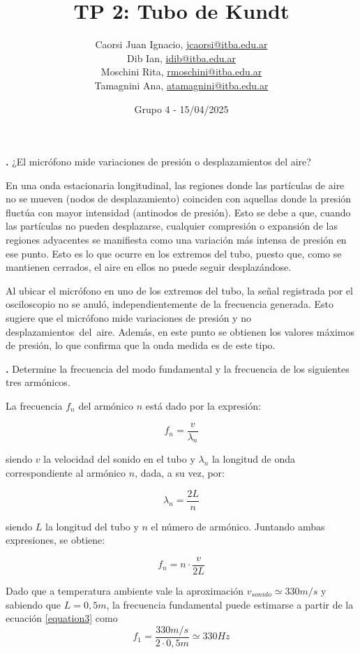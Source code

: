 \documentclass[12pt, a4paper]{article}
\title{TP 2: Tubo de Kundt}
\author
{
  Caorsi Juan Ignacio, \href{jcaorsi@itba.edu.ar}{jcaorsi@itba.edu.ar} \\
  Dib Ian, \href{idib@itba.edu.ar}{idib@itba.edu.ar} \\
  Moschini Rita, \href{rmoschini@itba.edu.ar}{rmoschini@itba.edu.ar} \\
  Tamagnini Ana, \href{atamagnini@itba.edu.ar}{atamagnini@itba.edu.ar}
}
\date{Grupo 4 - 15/04/2025}
\newcounter{step}
\newcommand{\step}[1]
{
  \par\vspace{2ex}
  \stepcounter{step}
  \noindent\textbf{\arabic{step}.} #1\par\vspace{1ex}
}
\begin{document}
\maketitle


\step{¿El micrófono mide variaciones de presión o desplazamientos del aire?}

En una onda estacionaria longitudinal, las regiones donde las partículas de aire  no se mueven (nodos de desplazamiento) coinciden con aquellas donde la presión fluctúa con mayor intensidad (antinodos de presión). Esto se debe a que, cuando las partículas no pueden desplazarse, cualquier compresión o expansión de las regiones adyacentes se manifiesta como una variación más intensa de presión en ese punto. Esto es lo que ocurre en los extremos del tubo, puesto que, como se mantienen cerrados, el aire en ellos no puede seguir desplazándose.

Al ubicar el micrófono en uno de los extremos del tubo, la señal registrada por el osciloscopio no se anuló, independientemente de la frecuencia generada. Esto sugiere que el micrófono mide variaciones de presión y no desplazamientos del aire. Además, en este punto se obtienen los valores máximos de presión, lo que confirma que la onda medida es de este tipo.


\step{Determine la frecuencia del modo fundamental y la frecuencia de los siguientes tres armónicos.}

La frecuencia $f_{n}$ del armónico $n$ está dado por la expresión:

\begin{equation}
    f_{n} = \frac{v}{\lambda_{n}}
  \label{equation1}
\end{equation}

siendo $v$ la velocidad del sonido en el tubo y $\lambda_{n}$ la longitud de onda correspondiente al armónico $n$, dada, a su vez, por:

\begin{equation}
  \lambda_{n} = \frac{2L}{n}
  \label{equation2}
\end{equation}

siendo $L$ la longitud del tubo y $n$ el número de armónico. Juntando ambas expresiones, se obtiene:

\begin{equation}
  f_{n} = n \cdot \frac{v}{2L}
  \label{equation3}
\end{equation}

Dado que a temperatura ambiente vale la aproximación $v_{sonido}\simeq 330 m/s$ y sabiendo que $L=0,5 m$, la frecuencia fundamental puede estimarse a partir de la ecuación \ref{equation3} como 
$$f_{1} = \frac{330 m/s}{2 \cdot 0,5m} \simeq 330 Hz$$
\end{document}
